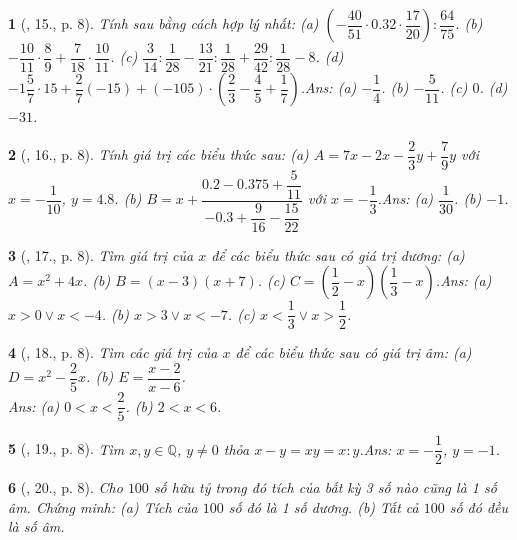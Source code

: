 \documentclass{article}
\newtheorem{baitoan}{}
\begin{document}
\begin{baitoan}[\cite{Tuyen_Toan_7}, 15., p. 8]
	Tính sau bằng cách hợp lý nhất: (a) $\left(-\dfrac{40}{51}\cdot 0.32\cdot\dfrac{17}{20}\right):\dfrac{64}{75}$. (b) $-\dfrac{10}{11}\cdot\dfrac{8}{9} + \dfrac{7}{18}\cdot\dfrac{10}{11}$. (c) $\dfrac{3}{14}:\dfrac{1}{28} - \dfrac{13}{21}:\dfrac{1}{28} + \dfrac{29}{42}:\dfrac{1}{28} - 8$. (d) $-1\dfrac{5}{7}\cdot 15 + \dfrac{2}{7}(-15) + (-105)\cdot\left(\dfrac{2}{3} - \dfrac{4}{5} + \dfrac{1}{7}\right)$.\hfill{\sf Ans: (a) $-\dfrac{1}{4}$. (b) $-\dfrac{5}{11}$. (c) $0$. (d) $-31$.}
\end{baitoan}

\begin{baitoan}[\cite{Tuyen_Toan_7}, 16., p. 8]
	Tính giá trị các biểu thức sau: (a) $A = 7x - 2x - \dfrac{2}{3}y + \dfrac{7}{9}y$ với $x = -\dfrac{1}{10}$, $y = 4.8$. (b) $B = x + \dfrac{0.2 - 0.375 + \dfrac{5}{11}}{-0.3 + \dfrac{9}{16} - \dfrac{15}{22}}$ với $x = -\dfrac{1}{3}$.\hfill{\sf Ans: (a) $\dfrac{1}{30}$. (b) $-1$.}
\end{baitoan}

\begin{baitoan}[\cite{Tuyen_Toan_7}, 17., p. 8]
	Tìm giá trị của $x$ để các biểu thức sau có giá trị dương: (a) $A = x^2 + 4x$. (b) $B = (x - 3)(x + 7)$. (c) $C = \left(\dfrac{1}{2} - x\right)\left(\dfrac{1}{3} - x\right)$.\hfill{\sf Ans: (a) $x > 0\lor x < -4$. (b) $x > 3\lor x < -7$. (c) $x < \dfrac{1}{3}\lor x > \dfrac{1}{2}$.}
\end{baitoan}

\begin{baitoan}[\cite{Tuyen_Toan_7}, 18., p. 8]
	Tìm các giá trị của $x$ để các biểu thức sau có giá trị âm: (a) $D = x^2 - \dfrac{2}{5}x$. (b) $E = \dfrac{x - 2}{x - 6}$.\\\mbox{}\hfill{\sf Ans: (a) $0 < x < \dfrac{2}{5}$. (b) $2 < x < 6$.}
\end{baitoan}

\begin{baitoan}[\cite{Tuyen_Toan_7}, 19., p. 8]
	Tìm $x,y\in\mathbb{Q}$, $y\ne 0$ thỏa $x - y = xy = x:y$.\hfill{\sf Ans: $x = -\dfrac{1}{2}$, $y = -1$.}
\end{baitoan}

\begin{baitoan}[\cite{Tuyen_Toan_7}, 20., p. 8]
	Cho $100$ số hữu tỷ trong đó tích của bất kỳ 3 số nào cũng là 1 số âm. Chứng minh: (a) Tích của $100$ số đó là 1 số dương. (b) Tất cả $100$ số đó đều là số âm.	
\end{baitoan}
\end{document}
